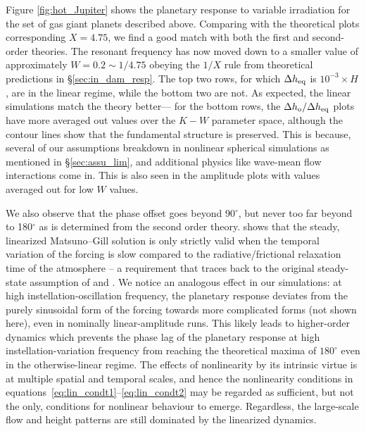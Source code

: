 \documentclass[trackchanges,twocolumn]{aastex7}
\begin{document}
Figure \ref{fig:hot_Jupiter} shows the planetary response to variable irradiation for the set of gas giant planets described above. Comparing with the theoretical plots corresponding $X=4.75$, we find a good match with both the first and second-order theories. The resonant frequency has now moved down to a smaller value of approximately $W=0.2\sim 1/4.75$ obeying the $1/X$ rule from theoretical predictions in \S \ref{sec:in_dam_resp}. The top two rows, for which $\Delta h_{\rm eq}$ is $10^{-3} \times H$, are in the linear regime, while the bottom two are not. As expected, the linear simulations match the theory better--- for the bottom rows, the $\Delta h_{\rm o} / \Delta h_{\rm eq}$ plots have more averaged out values over the $K-W$ parameter space, although the contour lines show that the fundamental structure is preserved. This is because, several of our assumptions breakdown in nonlinear spherical simulations as mentioned in \S \ref{sec:assu_lim}, and additional physics like wave-mean flow interactions come in. This is also seen in the amplitude plots with values averaged out for low $W$ values.   

We also observe that the phase offset goes beyond 90$^\circ$, but never too far beyond to 180$^\circ$ as is determined from the second order theory. \citep{Shamir2023} shows that the steady, linearized Matsuno--Gill solution is only strictly valid when the temporal variation of the forcing is slow compared to the radiative/frictional relaxation time of the atmosphere -- a requirement that traces back to the original steady-state assumption of \citet{Matsuno1966} and \citet{Gill1980}. We notice an analogous effect in our simulations: at high instellation-oscillation frequency, the planetary response deviates from the purely sinusoidal form of the forcing towards more complicated forms (not shown here), even in nominally linear-amplitude runs. This likely leads to higher-order dynamics which prevents the phase lag of the planetary response at high instellation-variation frequency from reaching the theoretical maxima of $180^{\circ}$ even in the otherwise-linear regime. The effects of nonlinearity by its intrinsic virtue is at multiple spatial and temporal scales, and hence the nonlinearity conditions in equations~\eqref{eq:lin_condt1}--\eqref{eq:lin_condt2} may be regarded as sufficient, but not the only, conditions for nonlinear behaviour to emerge. Regardless, the large-scale flow and height patterns are still dominated by the linearized dynamics. 
\end{document}
